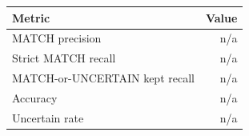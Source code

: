 \begin{tabular}{lr}
\toprule
Metric & Value \\
\midrule
MATCH precision & n/a \\
Strict MATCH recall & n/a \\
MATCH-or-UNCERTAIN kept recall & n/a \\
Accuracy & n/a \\
Uncertain rate & n/a \\
\bottomrule
\end{tabular}
